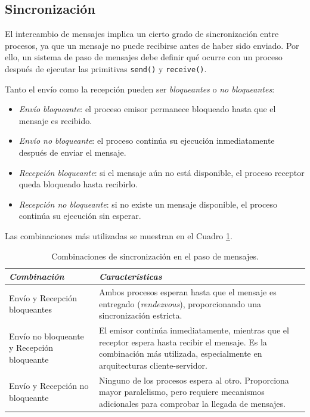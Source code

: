 \subsection{Sincronización}

El intercambio de mensajes implica un cierto grado de sincronización entre procesos, ya que un mensaje no puede recibirse antes de haber sido enviado. Por ello, un sistema de paso de mensajes debe definir qué ocurre con un proceso después de ejecutar las primitivas \texttt{send()} y \texttt{receive()}.

Tanto el envío como la recepción pueden ser \textit{bloqueantes} o \textit{no bloqueantes}:
\begin{itemize}
  \item \textit{Envío bloqueante}: el proceso emisor permanece bloqueado hasta que el mensaje es recibido.
  \item \textit{Envío no bloqueante}: el proceso continúa su ejecución inmediatamente después de enviar el mensaje.
  \item \textit{Recepción bloqueante}: si el mensaje aún no está disponible, el proceso receptor queda bloqueado hasta recibirlo.
  \item \textit{Recepción no bloqueante}: si no existe un mensaje disponible, el proceso continúa su ejecución sin esperar.
\end{itemize}

Las combinaciones más utilizadas se muestran en el Cuadro \ref{tab:combinaciones_de_sincronizacion}.

\begin{table}[!ht]
\centering
\begin{tabular}{>{\footnotesize\raggedright\arraybackslash}p{3.7cm} >{\footnotesize}p{9cm}}
\toprule
\normalsize\textit{Combinación} & \normalsize\textit{Características} \\
\midrule
Envío y Recepción bloqueantes &
Ambos procesos esperan hasta que el mensaje es entregado (\textit{rendezvous}), proporcionando una sincronización estricta. \\
\addlinespace

Envío no bloqueante y Recepción bloqueante &
El emisor continúa inmediatamente, mientras que el receptor espera hasta recibir el mensaje. Es la combinación más utilizada, especialmente en arquitecturas cliente-servidor. \\
\addlinespace

Envío y Recepción no bloqueante &
Ninguno de los procesos espera al otro. Proporciona mayor paralelismo, pero requiere mecanismos adicionales para comprobar la llegada de mensajes. \\
\bottomrule
\end{tabular}
\caption{Combinaciones de sincronización en el paso de mensajes.}
\label{tab:combinaciones_de_sincronizacion}
\end{table}

